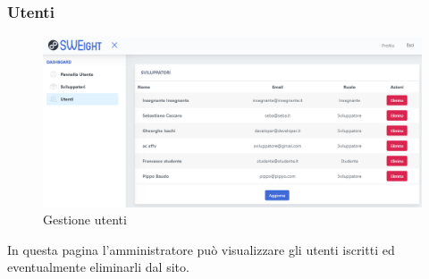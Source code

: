 		\subsubsection{Utenti}
			\begin{figure}[H]
			\centering
			\includegraphics[width=17cm]{sez/img/amministratore/gestisciutenti.PNG}
			\caption{Gestione utenti}\label{fig:1}
			\end{figure}
		  In questa pagina l'amministratore può visualizzare gli utenti iscritti ed eventualmente eliminarli dal sito.
